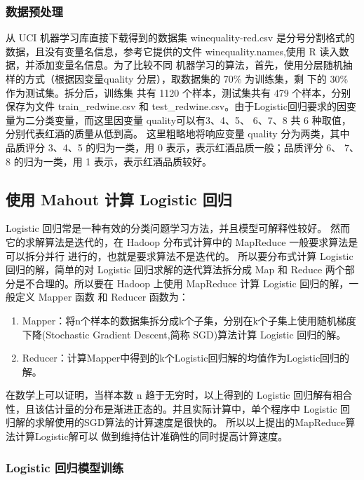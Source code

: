 \subsubsection{数据预处理}\label{ux6570ux636eux9884ux5904ux7406}

从 UCI 机器学习库直接下载得到的数据集 winequality-red.csv
是分号分割格式的数据，且没有变量名信息，参考它提供的文件
winequality.names,使用 R 读入数据，并添加变量名信息。为了比较不同
机器学习的算法，首先，使用分层随机抽样的方式（根据因变量quality
分层），取数据集的 70\% 为训练集，剩 下的 30\% 作为测试集。拆分后，训练集
共有 1120 个样本，测试集共有 479 个样本，分别保存为文件 train\_redwine.csv
和 test\_redwine.csv。由于Logistic回归要求的因变量为二分类变量，而这里因变量
quality可以有3、4、5、 6、7、8 共 6 种取值，分别代表红酒的质量从低到高。
这里粗略地将响应变量 quality 分为两类，其中品质评分 3、4、5
的归为一类，用 0 表示，表示红酒品质一般；品质评分 6、 7、8 的归为一类，用 1
表示，表示红酒品质较好。

\subsection{使用 Mahout 计算 Logistic
回归}\label{ux4f7fux7528-mahout-ux8ba1ux7b97-logistic-ux56deux5f52}

Logistic 回归常是一种有效的分类问题学习方法，并且模型可解释性较好。
然而它的求解算法是迭代的，在 Hadoop 分布式计算中的 MapReduce
一般要求算法是可以拆分并行 进行的，也就是要求算法不是迭代的。
所以要分布式计算 Logistic 回归的解，简单的对 Logistic
回归求解的迭代算法拆分成 Map 和 Reduce 两个部分是不合理的。所以要在
Hadoop 上使用 MapReduce 计算 Logistic 回归的解，一般定义 Mapper 函数 和
Reducer 函数为：

\begin{enumerate}
\def\labelenumi{\arabic{enumi}.}
\item
  Mapper：将n个样本的数据集拆分成k个子集，分别在k个子集上使用随机梯度下降(Stochastic
  Gradient Descent,简称 SGD)算法计算 Logistic 回归的解。
\item
  Reducer：计算Mapper中得到的k个Logistic回归解的均值作为Logistic回归的解。
\end{enumerate}

在数学上可以证明，当样本数 n 趋于无穷时，以上得到的 Logistic
回归解有相合性，且该估计量的分布是渐进正态的。并且实际计算中，单个程序中
Logistic 回归解的求解使用的SGD算法的计算速度是很快的。
所以以上提出的MapReduce算法计算Logistic解可以
做到维持估计准确性的同时提高计算速度。

\subsubsection{Logistic
回归模型训练}\label{logistic-ux56deux5f52ux6a21ux578bux8badux7ec3}

